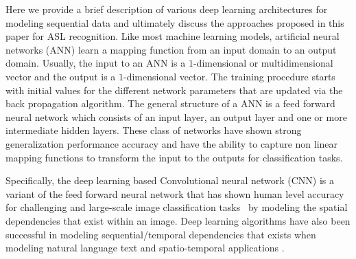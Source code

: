 \documentclass[10pt,twocolumn,letterpaper]{article}
\begin{document}
Here we provide a brief description of various 
deep learning architectures for modeling sequential data and ultimately discuss 
the approaches proposed in this paper for ASL recognition. 
%
Like most  machine learning models,  artificial neural networks (ANN)
learn a mapping function from an input domain to an 
output domain. Usually, the 
input to an ANN is a $1$-dimensional 
or multidimensional vector and the 
output is a $1$-dimensional 
vector. The training procedure starts 
with initial values for the different 
network parameters that are updated via the 
back propagation algorithm. 
The general structure of a ANN is 
a feed forward neural network which consists of an input layer, an output layer and one or more intermediate hidden layers.  These class of 
networks have shown 
strong generalization 
performance accuracy and have the ability to capture 
non linear mapping functions to transform the input to the outputs for classification tasks. 


Specifically, the deep learning based 
Convolutional neural network (CNN)  is  a  variant of the 
feed forward neural network that 
has shown human level accuracy for challenging and large-scale 
image classification tasks~\cite{NIPS2012_4824} by modeling the spatial dependencies that exist within an image. Deep 
learning algorithms have also been successful in modeling sequential/temporal 
dependencies that exists when modeling natural language text \cite{DBLP:journals/corr/Graves13,DBLP:journals/corr/SutskeverVL14,DBLP:journals/corr/BahdanauCB14} and spatio-temporal applications \cite{DBLP:journals/corr/abs-0705-2011}. 
\end{document}
